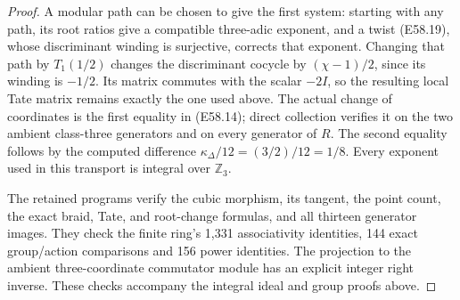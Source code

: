 \begin{proof}
A modular path can be chosen to give the first system:
starting with any path, its root ratios give a compatible
three-adic exponent, and a twist (E58.19), whose discriminant
winding is surjective, corrects that exponent.
Changing that path by $T_1(1/2)$ changes the discriminant
cocycle by $(\chi-1)/2$, since its winding is $-1/2$.
Its matrix commutes with the scalar $-2I$, so the resulting
local Tate matrix remains exactly the one used above.
The actual change of coordinates is the first equality in
(E58.14); direct collection verifies it on the two ambient
class-three generators and on every generator of $R$.
The second equality follows by the computed difference
$\kappa_\Delta/12=(3/2)/12=1/8$.
Every exponent used in this transport is integral over
$\mathbb Z_3$.

The retained programs verify the cubic morphism, its tangent,
the point count, the exact braid, Tate, and root-change formulas,
and all thirteen generator images. They check the finite ring's
1,331 associativity identities, 144 exact group/action
comparisons and 156 power identities. The projection to the
ambient three-coordinate commutator module has an explicit
integer right inverse. These checks accompany the integral
ideal and group proofs above.
\end{proof}
